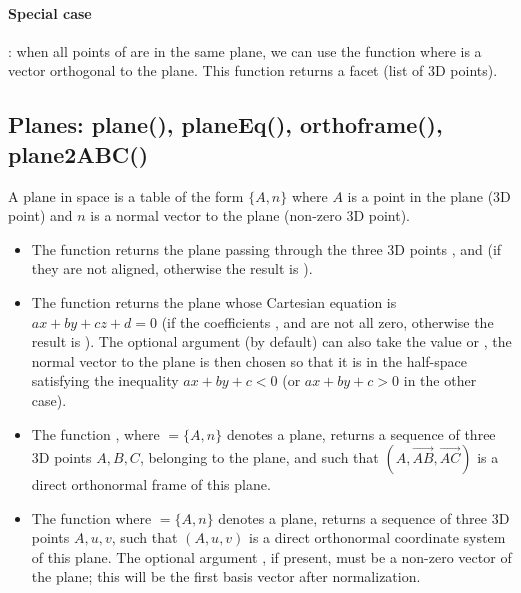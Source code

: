 \paragraph{Special case}: when all points of  are in the same plane, we can use the function  where  is a vector orthogonal to the plane. This function returns a facet (list of 3D points).

\subsection{Planes: plane(), planeEq(), orthoframe(), plane2ABC()}

A plane in space is a table of the form $\{A,n\}$ where $A$ is a point in the plane (3D point) and $n$ is a normal vector to the plane (non-zero 3D point).
\begin{itemize}
    \item The function  returns the plane passing through the three 3D points ,  and  (if they are not aligned, otherwise the result is \nil).

    \item The function  returns the plane whose Cartesian equation is $ax+by+cz+d=0$ (if the coefficients ,  and  are not all zero, otherwise the result is \nil). The optional argument  (\nil by default) can also take the value  or , the normal vector to the plane is then chosen so that it is in the half-space satisfying the inequality $ax+by+c<0$ (or $ax+by+c>0$ in the other case).

    \item The function , where $=\{A,n\}$ denotes a plane, returns a sequence of three 3D points $A,B,C$, belonging to the plane, and such that $(A,\vec{AB},\vec{AC})$ is a direct orthonormal frame of this plane.

    \item The function  where $=\{A,n\}$ denotes a plane, returns a sequence of three 3D points $A,u,v$, such that $(A,u,v)$ is a direct orthonormal coordinate system of this plane. The optional argument , if present, must be a non-zero vector of the plane; this will be the first basis vector after normalization.
\end{itemize}

